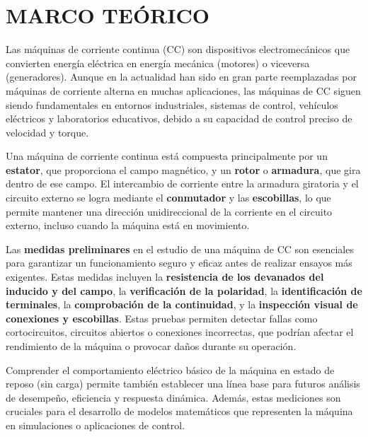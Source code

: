 \section{MARCO TEÓRICO}
Las máquinas de corriente continua (CC) son dispositivos electromecánicos que convierten energía eléctrica en energía mecánica (motores) o viceversa (generadores). Aunque en la actualidad han sido en gran parte reemplazadas por máquinas de corriente alterna en muchas aplicaciones, las máquinas de CC siguen siendo fundamentales en entornos industriales, sistemas de control, vehículos eléctricos y laboratorios educativos, debido a su capacidad de control preciso de velocidad y torque.\newline

Una máquina de corriente continua está compuesta principalmente por un \textbf{estator}, que proporciona el campo magnético, y un \textbf{rotor} o \textbf{armadura}, que gira dentro de ese campo. El intercambio de corriente entre la armadura giratoria y el circuito externo se logra mediante el \textbf{conmutador} y las \textbf{escobillas}, lo que permite mantener una dirección unidireccional de la corriente en el circuito externo, incluso cuando la máquina está en movimiento.\newline

Las \textbf{medidas preliminares} en el estudio de una máquina de CC son esenciales para garantizar un funcionamiento seguro y eficaz antes de realizar ensayos más exigentes. Estas medidas incluyen la \textbf{resistencia de los devanados del inducido y del campo}, la \textbf{verificación de la polaridad}, la \textbf{identificación de terminales}, la \textbf{comprobación de la continuidad}, y la \textbf{inspección visual de conexiones y escobillas}. Estas pruebas permiten detectar fallas como cortocircuitos, circuitos abiertos o conexiones incorrectas, que podrían afectar el rendimiento de la máquina o provocar daños durante su operación.\newline

Comprender el comportamiento eléctrico básico de la máquina en estado de reposo (sin carga) permite también establecer una línea base para futuros análisis de desempeño, eficiencia y respuesta dinámica. Además, estas mediciones son cruciales para el desarrollo de modelos matemáticos que representen la máquina en simulaciones o aplicaciones de control.\newline



